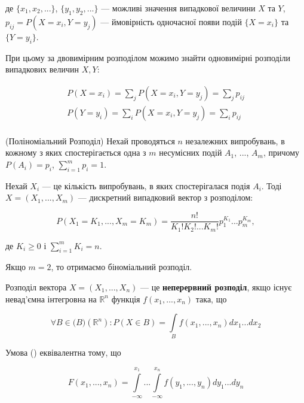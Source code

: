 де $\{x_1, x_2, ...\}$, $\{y_1, y_2, ...\}$ --- можливі значення випадкової
величини $X$ та $Y$, $p_{ij} = P(X = x_i, Y = y_j)$ --- ймовірність одночасної
появи подій $\{X = x_i\}$ та $\{Y = y_i\}$.

При цьому за двовимірним розподілом можимо знайти одновимірні розподіли
випадкових величин $X, Y$:

\begin{equation}
    \begin{array}{c}
        P(X = x_i) = \sum\limits_j P(X = x_i, Y = y_j) = \sum\limits_j p_{ij} \\
        P(Y = y_i) = \sum\limits_i P(X = x_i, Y = y_j) = \sum\limits_i p_{ij} \\
    \end{array}
\end{equation}

\begin{example}(Поліноміальний Розподіл)
    Нехай проводяться $n$ незалежних випробувань, в кожному з яких
    спостерігається одна з $m$ несумісних подій $A_1$, ..., $A_m$,
    причому $P(A_i) = p_i$, $\sum\limits_{i = 1}^m p_i = 1$.
    
\end{example}


Нехай $X_i$ --- це кількість випробувань, в яких спостерігалася подія $A_i$.
Тоді $X = (X_1, ..., X_m)$ --- дискретний випадковий вектор з розподілом:

\begin{equation}
    P(X_1 = K_1, ..., X_m = K_m)
    = \frac{n!}{K_1!K_2!...K_m!} p_1^{K_1} ... p_m^{K_m},
\end{equation}

де $K_i \geqslant 0$ і $\sum\limits_{i = 1}^m K_i = n$.

Якщо $m = 2$, то отримаємо біноміальний розподіл.

Розподіл вектора $X = (X_1, ..., X_n)$ --- це \textbf{неперервний розподіл},
якщо існує невад'ємна інтегровна на $\mathbb{R}^n$ функція $f(x_1, ..., x_n)$ така, що

\begin{equation}
    \forall B \in \mathcal(B)(\mathbb{R}^n): P(X \in B ) = \int\limits_B f(x_1, ..., x_n)dx_1...dx_2
\end{equation}

Умова () еквівалентна тому, що 

\begin{equation}
    F(x_1, ..., x_n)
    = \int\limits_{-\infty}^{x_1} ... \int\limits_{-\infty}^{x_n}
        f(y_1, ..., y_n)dy_1...dy_n
\end{equation}

